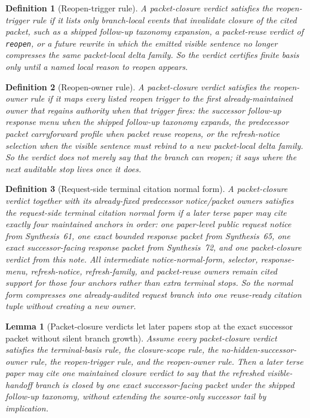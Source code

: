 \documentclass[11pt]{article}
\newtheorem{definition}{Definition}
\newtheorem{lemma}{Lemma}
\begin{document}
\begin{definition}[Reopen-trigger rule]
A packet-closure verdict satisfies the \emph{reopen-trigger rule} if it lists only branch-local events that invalidate closure of the cited packet, such as a shipped follow-up taxonomy expansion, a packet-reuse verdict of \texttt{reopen}, or a future rewrite in which the emitted visible sentence no longer compresses the same packet-local delta family.
So the verdict certifies finite basis only until a named local reason to reopen appears.
\end{definition}

\begin{definition}[Reopen-owner rule]
A packet-closure verdict satisfies the \emph{reopen-owner rule} if it maps every listed reopen trigger to the first already-maintained owner that regains authority when that trigger fires: the successor follow-up response menu when the shipped follow-up taxonomy expands, the predecessor packet carryforward profile when packet reuse reopens, or the refresh-notice selection when the visible sentence must rebind to a new packet-local delta family.
So the verdict does not merely say that the branch can reopen; it says where the next auditable stop lives once it does.
\end{definition}

\begin{definition}[Request-side terminal citation normal form]
A packet-closure verdict together with its already-fixed predecessor notice/packet owners satisfies the \emph{request-side terminal citation normal form} if a later terse paper may cite exactly four maintained anchors in order: one paper-level public request notice from Synthesis~61, one exact bounded response packet from Synthesis~65, one exact successor-facing response packet from Synthesis~72, and one packet-closure verdict from this note.
All intermediate notice-normal-form, selector, response-menu, refresh-notice, refresh-family, and packet-reuse owners remain cited support for those four anchors rather than extra terminal stops.
So the normal form compresses one already-audited request branch into one reuse-ready citation tuple without creating a new owner.
\end{definition}

\begin{lemma}[Packet-closure verdicts let later papers stop at the exact successor packet without silent branch growth]
Assume every packet-closure verdict satisfies the terminal-basis rule, the closure-scope rule, the no-hidden-successor-owner rule, the reopen-trigger rule, and the reopen-owner rule.
Then a later terse paper may cite one maintained closure verdict to say that the refreshed visible-handoff branch is closed by one exact successor-facing packet under the shipped follow-up taxonomy, without extending the source-only successor tail by implication.
\end{lemma}
\end{document}
